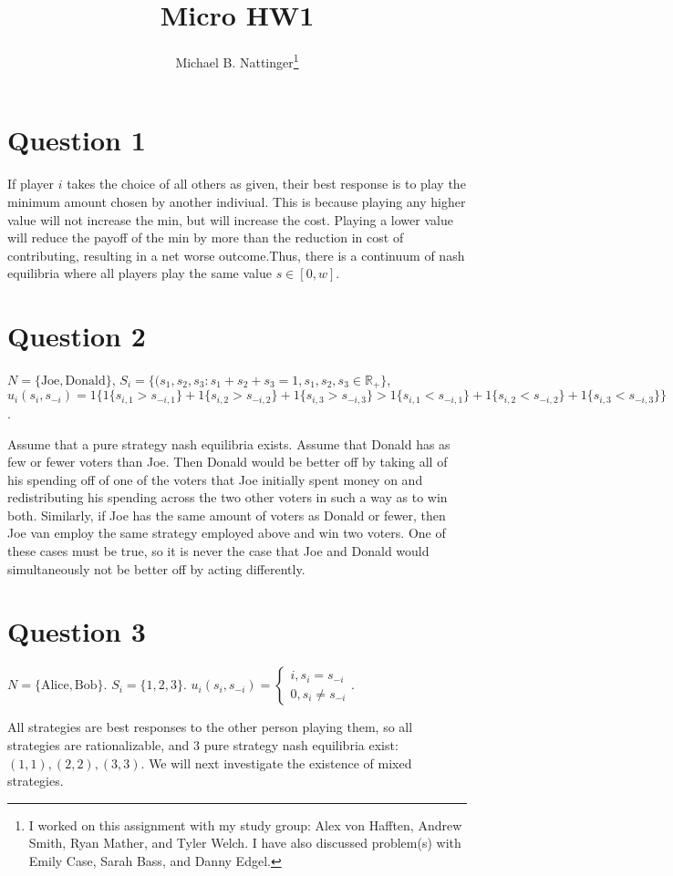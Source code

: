 \documentclass[11pt]{article} %
\title{Micro HW1}
\author{Michael B. Nattinger\footnote{I worked on this assignment with my study group: Alex von Hafften, Andrew Smith, Ryan Mather, and Tyler Welch. I have also discussed problem(s) with Emily Case, Sarah Bass, and Danny Edgel.}}
\begin{document}
\maketitle

\section{Question 1}
If player $i$ takes the choice of all others as given, their best response is to play the minimum amount chosen by another indiviual. This is because playing any higher value will not increase the min, but will increase the cost. Playing a lower value will reduce the payoff of the min by more than the reduction in cost of contributing, resulting in a net worse outcome.Thus, there is a continuum of nash equilibria where all players play the same value $s \in [0,w]$.
\section{Question 2}
$N = \{\text{Joe}, \text{Donald} \}$, $S_i = \{(s_1,s_2,s_3: s_1+s_2+s_3 = 1, s_1,s_2,s_3 \in \mathbb{R}_{+} \}$, $u_i(s_i,s_{-i}) = 1\{ 1\{s_{i,1}>s_{-i,1} \}+1\{ s_{i,2}>s_{-i,2} \} + 1\{s_{i,3}>s_{-i,3} \} > 1\{s_{i,1}<s_{-i,1} \}+1\{ s_{i,2}<s_{-i,2} \} + 1\{s_{i,3}<s_{-i,3} \} \}$.

Assume that a pure strategy nash equilibria exists. Assume that Donald has as few or fewer voters than Joe. Then Donald would be better off by taking all of his spending off of one of the voters that Joe initially spent money on and redistributing his spending across the two other voters in such a way as to win both. Similarly, if Joe has the same amount of voters as Donald or fewer, then Joe van employ the same strategy employed above and win two voters. One of these cases must be true, so it is never the case that Joe and Donald would simultaneously not be better off by acting differently.

\section{Question 3}
$N = \{ \text{Alice}, \text{Bob}\}.$ $S_i = \{1,2,3\}$. $u_i(s_i,s_{-i}) = \begin{cases} i, s_i = s_{-i}\\0, s_i \neq s_{-i} \end{cases}$. 

All strategies are best responses to the other person playing them, so all strategies are rationalizable, and 3 pure strategy nash equilibria exist: $(1,1),(2,2),(3,3)$. We will next investigate the existence of mixed strategies.
\end{document}
